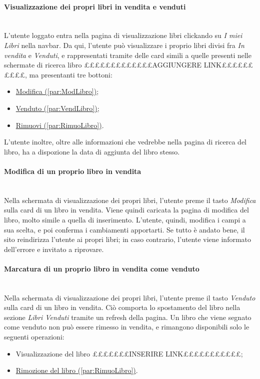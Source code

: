 \paragraph{Visualizzazione dei propri libri in vendita e venduti}\mbox{}\\
\label{par:VisLibriUt}
L'utente loggato entra nella pagina di visualizzazione libri clickando su \textit{I miei Libri} nella navbar. Da qui, l'utente può visualizzare i proprio libri divisi fra \textit{In vendita} e \textit{Venduti}, e rappresentati tramite delle card simili a quelle presenti nelle schermate di ricerca libro £££££££££££££AGGIUNGERE LINK££££££££££, ma presentanti tre bottoni:
\begin{itemize}
	\item \hyperref[par:ModLibro]{Modifica (\ref{par:ModLibro})};
	\item \hyperref[par:VendLibro]{Venduto (\ref{par:VendLibro})};
	\item \hyperref[par:RimuoLibro]{Rimuovi (\ref{par:RimuoLibro})}.
\end{itemize}
L'utente inoltre, oltre alle informazioni che vedrebbe nella pagina di ricerca del libro, ha a dispozione la data di aggiunta del libro stesso.

\paragraph{Modifica di un proprio libro in vendita}\mbox{}\\
\label{par:ModLibro}
Nella schermata di visualizzazione dei propri libri, l'utente preme il tasto \textit{Modifica} sulla card di un libro in vendita. Viene quindi caricata la pagina di modifica del libro, molto simile a quella di inserimento. L'utente, quindi, modifica i campi a sua scelta, e poi conferma i cambiamenti apportarti. Se tutto è andato bene, il sito reindirizza l'utente ai propri libri; in caso contrario, l'utente viene informato dell'errore e invitato a riprovare.

\paragraph{Marcatura di un proprio libro in vendita come venduto}\mbox{}\\
\label{par:VendLibro}
Nella schermata di visualizzazione dei propri libri, l'utente preme il tasto \textit{Venduto} sulla card di un libro in vendita. Ciò comporta lo spostamento del libro nella sezione \textit{Libri Venduti} tramite un refresh della pagina. Un libro che viene segnato come venduto non può essere rimesso in vendita, e rimangono disponibili solo le seguenti operazioni:
\begin{itemize}
	\item Visualizzazione del libro £££££££INSERIRE LINK£££££££££££;
	\item \hyperref[par:RimuoLibro]{Rimozione del libro (\ref{par:RimuoLibro})}.
\end{itemize}

